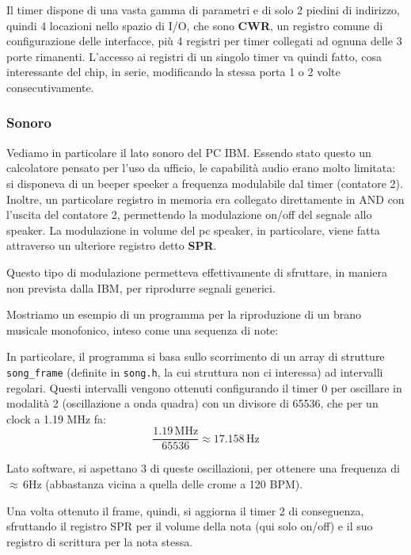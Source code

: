 \documentclass[a4paper,11pt]{article}
\begin{document}
Il timer dispone di una vasta gamma di parametri e di solo 2 piedini di indirizzo, quindi 4 locazioni nello spazio di I/O, che sono \textbf{CWR}, un registro comune di configurazione delle interfacce, più 4 registri per timer collegati ad ognuna delle 3 porte rimanenti.
L'accesso ai registri di un singolo timer va quindi fatto, cosa interessante del chip, in serie, modificando la stessa porta 1 o 2 volte consecutivamente.


\subsubsection{Sonoro}
Vediamo in particolare il lato sonoro del PC IBM.
Essendo stato questo un calcolatore pensato per l'uso da ufficio, le capabilità audio erano molto limitata: si disponeva di un beeper speeker a frequenza modulabile dal timer (contatore 2).
Inoltre, un particolare registro in memoria era collegato direttamente in AND con l'uscita del contatore 2, permettendo la modulazione on/off del segnale allo speaker.
La modulazione in volume del pc speaker, in particolare, viene fatta attraverso un ulteriore registro detto \textbf{SPR}.

Questo tipo di modulazione permetteva effettivamente di sfruttare, in maniera non prevista dalla IBM, per riprodurre segnali generici.

Mostriamo un esempio di un programma per la riproduzione di un brano musicale monofonico, inteso come una sequenza di note:



In particolare, il programma si basa sullo scorrimento di un array di strutture \lstinline|song_frame| (definite in \lstinline|song.h|, la cui struttura non ci interessa) ad intervalli regolari.
Questi intervalli vengono ottenuti configurando il timer 0 per oscillare in modalità 2 (oscillazione a onda quadra) con un divisore di 65536, che per un clock a 1.19 MHz fa:
$$
\frac{1.19 \, \mathrm{MHz}}{65536} \approx 17.158 \, \mathrm{Hz}
$$

Lato software, si aspettano 3 di queste oscillazioni, per ottenere una frequenza di $\approx \, 6 \mathrm{Hz}$ (abbastanza vicina a quella delle crome a 120 BPM).

Una volta ottenuto il frame, quindi, si aggiorna il timer 2 di conseguenza, sfruttando il registro SPR per il volume della nota (qui solo on/off) e il suo registro di scrittura per la nota stessa.
\end{document}
